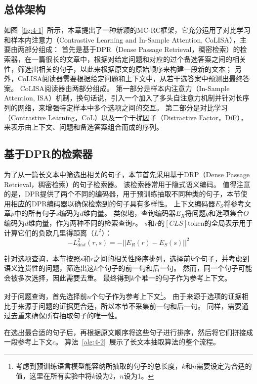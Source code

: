 \subsection{总体架构}
如图~\ref{fig:4-1}~所示，本章提出了一种新颖的MC-RC框架，它充分运用了对比学习和样本内注意力（Contrastive Learning and In-Sample Attention, CoLISA），主要由两部分组成：
首先是基于DPR（Dense Passage Retrieval，稠密检索）的检索器，在一篇很长的文章中，根据对给定问题和对应的过个备选答案之间的相关性，筛选出相关的句子，以此来根据原文的原始顺序来构建一段新的文本；
另外，CoLISA阅读器需要根据给定问题和上下文中，从若干选答案中预测出最终答案。
CoLISA阅读器由两部分组成。
第一部分是样本内注意力（In-Sample Attention, ISA）机制，换句话说，引入一个加入了多头自注意力机制并针对长序列的网络，来增强特定样本中多个选项之间的交互。
第二部分是对比学习（Contrastive Learning，CoL）以及一个干扰因子（Distractive Factor，DiF），来表示由上下文、问题和备选答案组合而成的序列。



\subsection{基于DPR的检索器}
为了从一篇长文本中筛选出相关的句子，本节首先采用基于DRP（Dense Passage Retrieval，稠密检索）的句子检索器。
该检索器常用于隐式语义编码\cite{karpukhin2020dense}。
值得注意的是，DPR提供了两个不同的编码器，用于预训练抽取不同种类的句子，本节使用相应的DPR编码器以确保检索到的句子具有多样性。
上下文编码器$E_S$将参考文章$p$中的所有句子$s$编码为$d$维向量。
类似地，查询编码器$E_R$将问题$q$和选项集合$O$编码为$d$维向量，作为两种不同的检索查询$r$。
$s$和$r$的$[CLS]$token的全局表示用于计算它们的负欧几里得距离（$L^2$）：
\begin{equation}
    -L^2_{dist}(r,s)=-||E_R(r)-E_S(s)||^2
\end{equation}

针对选项查询，本节按照$s$和$r$之间的相关性降序排列，选择前$k$个句子，并考虑到语义连贯性的问题，筛选出这$k$个句子的前一句和后一句。
然而，同一个句子可能会被多次选择，因此需要去重。
最终得到$k$个唯一的句子作为参考上下文。

对于问题查询，首先选择前$n$个句子作为参考上下文\footnote{考虑到预训练语言模型能容纳所抽取的句子的总长度，$k$和$n$需要设定为合适的值，这里在所有实验中将$k$设为2，$n$设为1。}。
由于来源于选项的证据相比于来源于问题的证据更合适，所以本节不采集前一句和后一句。
同样，需要通过去重来确保所有抽取句子的唯一性。

在选出最合适的句子后，再根据原文顺序将这些句子进行排序，然后将它们拼接成一段参考上下文$c$。
算法~\ref{alg:4-2}~展示了长文本抽取算法的整个流程。

